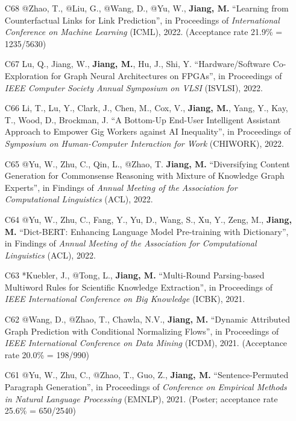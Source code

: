 \documentclass[10pt]{article}
\newenvironment{myindentpar}[1]%
{\begin{list}{}%
         {\setlength{\leftmargin}{#1}}%
         \item[]%
}
{\end{list}}
\newcounter{list}
\begin{document}
\begin{myindentpar}{0.00cm}
\begin{enumerate}[leftmargin=.5cm]
\item[C68] @Zhao, T., @Liu, G., @Wang, D., @Yu, W., \textbf{Jiang, M.} ``Learning from Counterfactual Links for Link Prediction'', in Proceedings of \textit{International Conference on Machine Learning} (ICML), 2022. (Acceptance rate 21.9\% = 1235/5630)

\item[C67] Lu, Q., Jiang, W., \textbf{Jiang, M.}, Hu, J., Shi, Y. ``Hardware/Software Co-Exploration for Graph Neural Architectures on FPGAs'', in Proceedings of \textit{IEEE Computer Society Annual Symposium on VLSI} (ISVLSI), 2022.

\item[C66] Li, T., Lu, Y., Clark, J., Chen, M., Cox, V., \textbf{Jiang, M.}, Yang, Y., Kay, T., Wood, D., Brockman, J. ``A Bottom-Up End-User Intelligent Assistant Approach to Empower Gig Workers against AI Inequality'', in Proceedings of \textit{Symposium on Human-Computer Interaction for Work} (CHIWORK), 2022.
		
\item[C65] @Yu, W., Zhu, C., Qin, L., @Zhao, T. \textbf{Jiang, M.} ``Diversifying Content Generation for Commonsense Reasoning with Mixture of Knowledge Graph Experts'', in Findings of \textit{Annual Meeting of the Association for Computational Linguistics} (ACL), 2022.

\item[C64] @Yu, W., Zhu, C., Fang, Y., Yu, D., Wang, S., Xu, Y., Zeng, M., \textbf{Jiang, M.} ``Dict-BERT: Enhancing Language Model Pre-training with Dictionary'', in Findings of \textit{Annual Meeting of the Association for Computational Linguistics} (ACL), 2022.

\item[C63] *Kuebler, J., @Tong, L., \textbf{Jiang, M.} ``Multi-Round Parsing-based Multiword Rules for Scientific Knowledge Extraction'', in Proceedings of \textit{IEEE International Conference on Big Knowledge} (ICBK), 2021.
		
\item[C62] @Wang, D., @Zhao, T., Chawla, N.V., \textbf{Jiang, M.} ``Dynamic Attributed Graph Prediction with Conditional Normalizing Flows'', in Proceedings of \textit{IEEE International Conference on Data Mining} (ICDM), 2021. (Acceptance rate 20.0\% = 198/990)

\item[C61] @Yu, W., Zhu, C., @Zhao, T., Guo, Z., \textbf{Jiang, M.} ``Sentence-Permuted Paragraph Generation'', in Proceedings of \textit{Conference on Empirical Methods in Natural Language Processing} (EMNLP), 2021. (Poster; acceptance rate 25.6\% = 650/2540)


\end{enumerate}
\end{myindentpar}
\end{document}
